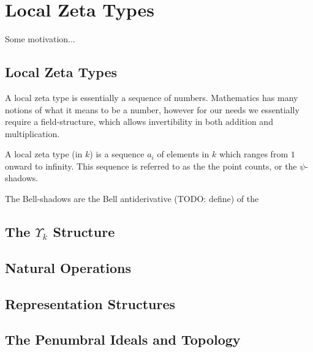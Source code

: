 \section{Local Zeta Types}
Some motivation...

\subsection{Local Zeta Types}
A local zeta type is essentially a sequence of numbers. Mathematics has many notions of what it means to be a number, however for our needs we essentially require a field-structure, which allows invertibility in both addition and multiplication. 

\begin{definition}
  A local zeta type (in $k$) is a sequence $a_i$ of elements in $k$ which ranges from $1$ onward to infinity. This sequence is referred to as the the point counts, or the $\psi$-shadows.
\end{definition}

\begin{definition}
  The Bell-shadows are the Bell antiderivative (TODO: define) of the 
\end{definition}

\subsection{The $\Upsilon_k$ Structure}

\subsection{Natural Operations}


\subsection{Representation Structures}

\subsection{The Penumbral Ideals and Topology}

